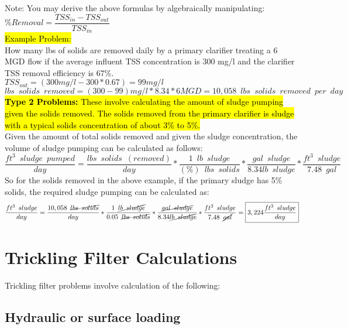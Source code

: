 Note:  You may derive the above formulas by algebraically manipulating: $\%Removal=\dfrac{TSS_{in} -TSS_{out}}{TSS_{in}}$\\
\hl{Example Problem:}\\
How many lbs of solids are removed daily by a primary clarifier treating a 6 MGD flow if the average influent TSS concentration is 300 mg/l and the clarifier TSS removal efficiency is 67\%.\\
$TSS_{out}=(300mg/l - 300*0.67)=99mg/l$\\
$lbs \enspace solids \enspace  removed = (300-99)mg/l*8.34*6MGD=\boxed{10,058 \enspace lbs \enspace solids \enspace removed \enspace per \enspace day}$\\
\vspace{0.5cm}
\hl{\textbf{Type 2 Problems:}  These involve calculating the amount of sludge pumping given the solids removed.  The solids removed from the primary clarifier is sludge with a typical solids concentration of about 3\% to 5\%.}\\
Given the amount of total solids removed and given the sludge concentration, the volume of sludge pumping can be calculated as follows:  $$\dfrac{ft^3\enspace sludge\enspace pumped}{ day}= \dfrac{lbs \enspace solids \enspace (removed)}{day} * \dfrac{1 \enspace lb \enspace sludge}{(\%)\enspace lbs \enspace solids}*\dfrac{gal \enspace sludge}{8.34lb \enspace sludge}*\dfrac{ft^3 \enspace sludge}{7.48 \enspace gal} $$
So for the solids removed in the above example, if the primary sludge has 5\% solids, the required sludge pumping can be calculated as:
$$\dfrac{ft^3\enspace sludge}{day}= \dfrac{10,058 \enspace \cancel{lbs \enspace solids}}{day} * \dfrac{1 \enspace \cancel{lb \enspace sludge}}{0.05\enspace \cancel{lbs \enspace solids}}*\dfrac{\cancel{gal \enspace sludge}}{8.34\cancel{lb \enspace sludge}}*\dfrac{ft^3 \enspace sludge}{7.48 \enspace \cancel{gal}}=\boxed{3,224\dfrac{ft^3 \enspace sludge}{day}} $$


\section{Trickling Filter Calculations}

Trickling filter problems involve calculation of the following:

\subsection{Hydraulic or surface loading}

